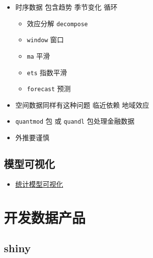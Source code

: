 \documentclass[
]{book}
\providecommand{\tightlist}{%
  \setlength{\itemsep}{0pt}\setlength{\parskip}{0pt}}
\begin{document}
\begin{itemize}
\tightlist
\item
  时序数据 包含趋势 季节变化 循环

  \begin{itemize}
  \tightlist
  \item
    效应分解 \texttt{decompose}
  \item
    \texttt{window} 窗口
  \item
    \texttt{ma} 平滑
  \item
    \texttt{ets} 指数平滑
  \item
    \texttt{forecast} 预测
  \end{itemize}
\item
  空间数据同样有这种问题 临近依赖 地域效应
\item
  \texttt{quantmod} 包 或 \texttt{quandl} 包处理金融数据
\item
  外推要谨慎
\end{itemize}

\hypertarget{ux6a21ux578bux53efux89c6ux5316}{%
\section{模型可视化}\label{ux6a21ux578bux53efux89c6ux5316}}

\begin{itemize}
\tightlist
\item
  \href{http://mfviz.com/hierarchical-models/}{统计模型可视化}
\end{itemize}

\hypertarget{product}{%
\chapter{开发数据产品}\label{product}}

\hypertarget{shiny}{%
\section{shiny}\label{shiny}}
\end{document}

